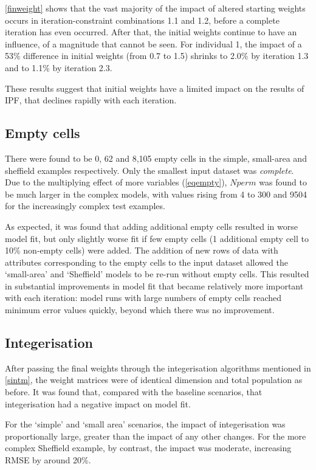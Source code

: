 \documentclass[a4paper,10pt]{article}
\begin{document}
\cref{finweight} shows that the vast majority of the impact of altered starting weights occurs in iteration-constraint
combinations 1.1 and 1.2, before a complete iteration has even occurred. 
After that, the initial weights continue to have an influence, of a magnitude that cannot be 
seen. For individual 1, the impact of a 53\% difference in initial weights (from 0.7 to 1.5) shrinks to 
2.0\% by iteration 1.3 and to 1.1\% by iteration 2.3. 

These results suggest that initial weights have a limited impact on the results of IPF, that declines rapidly with each iteration. 

\subsection{Empty cells}

There were found to be 0, 62 and 8,105 empty cells in the simple, small-area and sheffield
examples respectively. Only the smallest input dataset was
\emph{complete}. Due to the multiplying effect of more variables (\cref{eqempty}),
$Nperm$ was found to be much larger in the complex models, with values rising from
4 to 300 and 9504 for the increasingly complex test examples. 

As expected, it was found that adding additional empty cells
resulted in worse model fit, but only slightly worse fit if few empty
cells (1 additional empty cell to 10\% non-empty cells) were added.
The addition of new rows of data with attributes corresponding
to the empty cells to the input dataset allowed the `small-area' and `Sheffield'
models to be re-run without empty cells. This resulted in substantial improvements in
model fit that became relatively more important with each iteration: model
runs with large numbers of empty cells reached minimum error values quickly, beyond
which there was no improvement.

\subsection{Integerisation}

After passing the final weights through the integerisation algorithms mentioned
in \cref{sintm}, the weight matrices were of identical dimension and total population as
before. It was found that, compared with the baseline scenarios, that integerisation
had a negative impact on model fit.

For the `simple' and `small area' scenarios, the impact of integerisation was proportionally
large, greater than the impact of any other changes. For the more complex Sheffield example,
by contrast, the impact was moderate, increasing RMSE by around 20\%.
\end{document}

